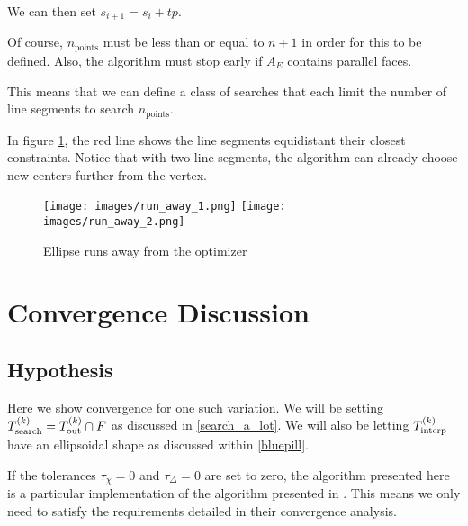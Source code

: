 We can then set $s_{i+1} = s_{i} + t p$.

Of course, $n_{\text{points}}$ must be less than or equal to $n + 1$ in order for this to be defined.
Also, the algorithm must stop early if $A_E$ contains parallel faces.



This means that we can define a class of searches that each limit the number of line segments to search $n_{\text{points}}$.

In figure \cref{line_can_run}, the red line shows the line segments equidistant their closest constraints.
Notice that with two line segments, the algorithm can already choose new centers further from the vertex.

\begin{figure}[h]
    \centering
    \texttt{[image: images/run\_away\_1.png]}
    \texttt{[image: images/run\_away\_2.png]}
    \caption{Ellipse runs away from the optimizer}
    \label{line_can_run}
\end{figure}




\section{Convergence Discussion}
\label{convergence_discussion}

\subsection{Hypothesis}

Here we show convergence for one such variation.
We will be setting ${T_{\text{search}}^{(k)}} = {T_{\text{out}}^{(k)}} \cap {F}$ as discussed in \cref{search_a_lot}.
We will also be letting ${T_{\text{interp}}^{(k)}}$ have an ellipsoidal shape as discussed within \cref{bluepill}. 

If the tolerances $\tau_{\chi} = 0$ and $\tau_{\Delta} = 0$ are set to zero, the algorithm presented here is a particular implementation of the algorithm presented in \cite{doi:10.1080/10556788.2015.1026968}.
This means we only need to satisfy the requirements detailed in their convergence analysis.


